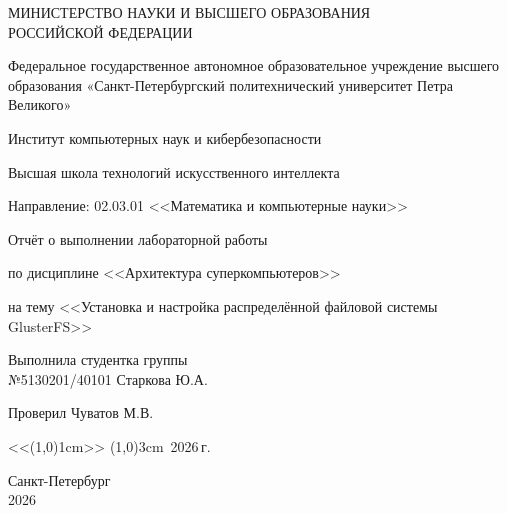 \thispagestyle{empty} %

\begin{center}
    МИНИСТЕРСТВО НАУКИ И ВЫСШЕГО ОБРАЗОВАНИЯ\\ РОССИЙСКОЙ ФЕДЕРАЦИИ

    Федеральное государственное автономное образовательное учреждение высшего образования «Санкт-Петербургский политехнический университет Петра Великого»

    Институт компьютерных наук и кибербезопасности

    Высшая школа технологий искусственного интеллекта

    Направление: 02.03.01 <<Математика и компьютерные науки>>

    \vspace{3cm}
    {\Large
        Отчёт о выполнении лабораторной работы

        по дисциплине <<Архитектура суперкомпьютеров>>

        на тему <<Установка и настройка распределённой файловой системы GlusterFS>>


    }
    \vspace{4cm}

    \begin{minipage}{\textwidth}
        Выполнила студентка группы \\
        №5130201/40101 \hfill Старкова Ю.А.

        \vspace{0.5cm}

        Проверил 
        \hfill Чуватов М.В.
    \end{minipage}

    \vspace{1cm}
    \hfill
    <<\line(1,0){1cm}>> \line(1,0){3cm}\, 2026\,г.

    \vspace{3cm}
    Санкт-Петербург \\
    2026
\end{center}